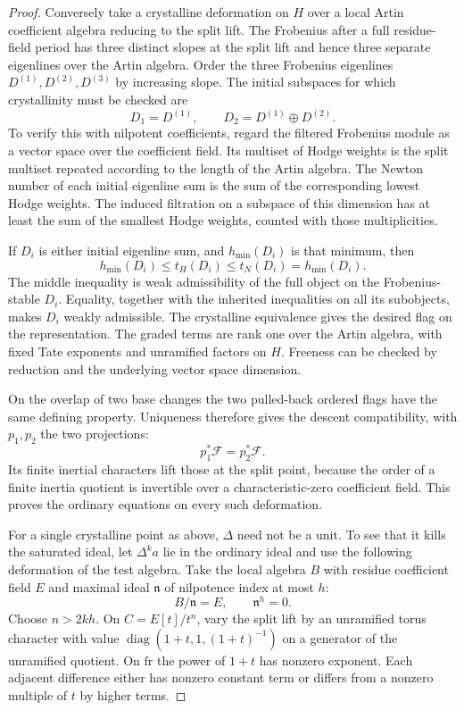 \begin{proof}
Conversely take a crystalline deformation on \(H\)
over a local Artin coefficient algebra reducing
to the split lift. The Frobenius after a full
residue-field period has three distinct slopes
at the split lift and hence three separate
eigenlines over the Artin algebra. Order the three Frobenius eigenlines \(D^{(1)},D^{(2)},D^{(3)}\) by increasing slope. The initial subspaces for which crystallinity must be checked are
\[
 D_1=D^{(1)},\qquad D_2=D^{(1)}\oplus D^{(2)} .
\] To verify this with
nilpotent coefficients, regard the filtered
Frobenius module as a vector space over the
coefficient field. Its multiset of Hodge
weights is the split multiset repeated
according to the length of the Artin
algebra. The Newton number of each initial
eigenline sum is the sum of the corresponding
lowest Hodge weights. The induced filtration on a subspace of this dimension has
at least the sum of the smallest Hodge weights, counted with
those multiplicities.

If \(D_i\) is either initial eigenline
sum, and \(h_{\min}(D_i)\) is that minimum, then
\[
 h_{\min}(D_i)\le t_H(D_i)\le t_N(D_i)=h_{\min}(D_i).
\]
The middle inequality is weak admissibility of the full
object on the Frobenius-stable \(D_i\). Equality, together
with the inherited inequalities on all its subobjects, makes
\(D_i\) weakly admissible. The crystalline equivalence
gives the desired flag on the representation.
The graded terms are rank one over the
Artin algebra, with fixed Tate exponents
and unramified factors on \(H\). Freeness
can be checked by reduction and the
underlying vector space dimension.

On the overlap of two base changes the two pulled-back ordered flags have the same defining property. Uniqueness therefore gives the descent compatibility, with \(p_1,p_2\) the two projections:
\[
 p_1^*\mathcal F=p_2^*\mathcal F .
\] Its finite inertial
characters lift those at the split point,
because the order of a finite inertia
quotient is invertible over a characteristic-zero
coefficient field. This proves the ordinary
equations on every such deformation.

For a single crystalline point as above,
\(\Delta\) need not be a unit. To see that
it kills the saturated ideal, let \(\Delta^k a\)
lie in the ordinary ideal and use the following
deformation of the test algebra. Take the local algebra \(B\) with residue coefficient field \(E\) and maximal ideal \(\mathfrak n\) of nilpotence index at most \(h\):
\[
 B/\mathfrak n=E,\qquad \mathfrak n^h=0 .
\] Choose \(n>2kh\). On
\(C=E[t]/t^n\), vary the split lift by
an unramified torus character with value
\(\operatorname{diag}(1+t,1,(1+t)^{-1})\)
on a generator of the unramified quotient.
On \(\mathrm{fr}\) the power of \(1+t\)
has nonzero exponent. Each adjacent difference either has nonzero constant term or differs from a nonzero multiple of \(t\) by higher terms.


\end{proof}
